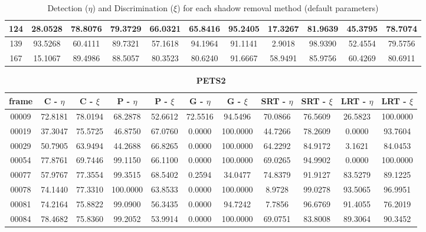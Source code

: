 \begin{appendices}
\begin{table}
\begin{tabular}{ |c|c|c|c|c|c|c|c|c|c|c| }
\hline
124 & 28.0528 &  78.8076 &   79.3729 &  66.0321 &   65.8416 &  95.2405 &   17.3267 &  81.9639 &   45.3795 &  78.7074 \\
\hline
139 & 93.5268 &  60.4111 &   89.7321 &  57.1618 &   94.1964 &  91.1141 &   2.9018 &  98.9390 &   52.4554 &  79.5756 \\
\hline
167 & 15.1067 &  89.4986 &   88.5057 &  80.3523 &   80.6240 &  91.6667 &   58.9491 &  85.9756 &   60.4269 &  80.6911 \\
\hline
\end{tabular}
\caption*{Detection ($\eta$) and Discrimination ($\xi$) for each shadow removal method (default parameters)}
\end{table}

\begin{table}
\centering
\caption{\textbf{PETS2}}
\begin{tabular}{ |c|c|c|c|c|c|c|c|c|c|c| }
	\hline
\textbf{frame} &  \textbf{C - $\eta$} &  \textbf{C - $\xi$} &  \textbf{P - $\eta$} &  \textbf{P - $\xi$} &  \textbf{G - $\eta$} &  \textbf{G - $\xi$} &  \textbf{SRT - $\eta$} &  \textbf{SRT - $\xi$} &  \textbf{LRT - $\eta$} &  \textbf{LRT - $\xi$} \\
\hline
\hline
00009 &  72.8181 &  78.0194 &   68.2878 &  52.6612 &   72.5516 &  94.5496 &   70.0866 &  76.5609 &   26.5823 &  100.0000 \\
\hline
00019 &  37.3047 &  75.5725 &   46.8750 &  67.0760 &   0.0000 &  100.0000 &   44.7266 &  78.2609 &   0.0000 &  93.7604 \\
\hline
00029 &  50.7905 &  63.9494 &   44.2688 &  66.8265 &   0.0000 &  100.0000 &   64.2292 &  84.9172 &   3.1621 &  84.0453 \\
\hline
00054 &  77.8761 &  69.7446 &   99.1150 &  66.1100 &   0.0000 &  100.0000 &   69.0265 &  94.9902 &   0.0000 &  100.0000 \\
\hline
00077 &  57.9767 &  77.3554 &   99.3515 &  68.5402 &   0.2594 &  34.0477 &   74.8379 &  91.9127 &   83.5279 &  89.1225 \\
\hline
00078 &  74.1440 &  77.3310 &   100.0000 &  63.8533 &   0.0000 &  100.0000 &   8.9728 &  99.0278 &   93.5065 &  96.9951 \\
\hline
00081 &  74.2164 &  75.8822 &   99.0900 &  56.3435 &   0.0000 &  94.7242 &   7.7856 &  96.6769 &   91.4055 &  76.2019 \\
\hline
00084 &  78.4682 &  75.8360 &   99.2052 &  53.9914 &   0.0000 &  100.0000 &   69.0751 &  83.8008 &   89.3064 &  90.3452 \\

\end{tabular}
\end{table}
\end{appendices}
